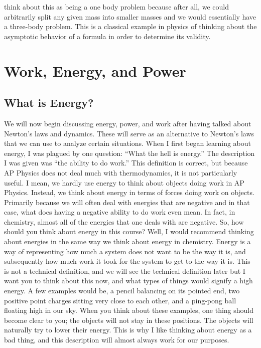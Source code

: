 \documentclass{article}[gray]
\numberwithin{equation}{subsection}
\begin{document}
think about this as being a one body problem because after all, we could arbitrarily split any given mass into smaller masses and we would essentially have a three-body problem. This is a classical example in physics of thinking about the asymptotic behavior of a formula in order to determine its validity.

\section{Work, Energy, and Power}
\subsection{What is Energy?}
\newline

We will now begin discussing energy, power, and work after having talked about Newton’s laws and dynamics. These will serve as an alternative to Newton’s laws that we can use to analyze certain situations. When I first began learning about energy, I was plagued by one question: “What the hell is energy.” The description I was given was “the ability to do work.” This definition is correct, but because AP Physics does not deal much with thermodynamics, it is not particularly useful.  I mean, we hardly use energy to think about objects doing work in AP Physics. Instead, we think about energy in terms of forces doing work on objects. Primarily because we will often deal with energies that are negative and in that case, what does having a negative ability to do work even mean. In fact, in chemistry, almost all of the energies that one deals with are negative. So, how should you think about energy in this course? Well, I would recommend thinking about energies in the same way we think about energy in chemistry. Energy is a way of representing how much a system does not want to be the way it is, and subsequently how much work it took for the system to get to the way it is. This is not a technical definition, and we will see the technical definition later but I want you to think about this now, and what types of things would signify a high energy. A few examples would be, a pencil balancing on its pointed end, two positive point charges sitting very close to each other, and a ping-pong ball floating high in our sky. When you think about these examples, one thing should become clear to you; the objects will not stay in these positions. The objects will naturally try to lower their energy. This is why I like thinking about energy as a bad thing, and this description will almost always work for our purposes.  
\end{document}
